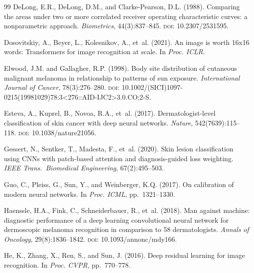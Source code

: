 \documentclass[12pt, a4paper]{article}
\begin{document}
\begin{thebibliography}{99}
DeLong, E.R., DeLong, D.M., and Clarke-Pearson, D.L. (1988).
\newblock Comparing the areas under two or more correlated receiver operating characteristic curves: a nonparametric approach.
\newblock \emph{Biometrics}, 44(3):837--845.
\newblock \textsc{doi}: 10.2307/2531595.

Dosovitskiy, A., Beyer, L., Kolesnikov, A., et~al. (2021).
\newblock An image is worth 16x16 words: Transformers for image recognition at scale.
\newblock In \emph{Proc. ICLR}.

Elwood, J.M. and Gallagher, R.P. (1998).
\newblock Body site distribution of cutaneous malignant melanoma in relationship to patterns of sun exposure.
\newblock \emph{International Journal of Cancer}, 78(3):276--280.
\newblock \textsc{doi}: 10.1002/(SICI)1097-0215(19981029)78:3\textless276::AID-IJC2\textgreater3.0.CO;2-S.

Esteva, A., Kuprel, B., Novoa, R.A., et~al. (2017).
\newblock Dermatologist-level classification of skin cancer with deep neural networks.
\newblock \emph{Nature}, 542(7639):115--118.
\newblock \textsc{doi}: 10.1038/nature21056.

Gessert, N., Sentker, T., Madesta, F., et~al. (2020).
\newblock Skin lesion classification using {CNNs} with patch-based attention and diagnosis-guided loss weighting.
\newblock \emph{IEEE Trans.\ Biomedical Engineering}, 67(2):495--503.

Guo, C., Pleiss, G., Sun, Y., and Weinberger, K.Q. (2017).
\newblock On calibration of modern neural networks.
\newblock In \emph{Proc. ICML}, pp.\ 1321--1330.

Haenssle, H.A., Fink, C., Schneiderbauer, R., et~al. (2018).
\newblock Man against machine: diagnostic performance of a deep learning convolutional neural network for dermoscopic melanoma recognition in comparison to 58 dermatologists.
\newblock \emph{Annals of Oncology}, 29(8):1836--1842.
\newblock \textsc{doi}: 10.1093/annonc/mdy166.

He, K., Zhang, X., Ren, S., and Sun, J. (2016).
\newblock Deep residual learning for image recognition.
\newblock In \emph{Proc. CVPR}, pp.\ 770--778.


\end{thebibliography}
\end{document}
